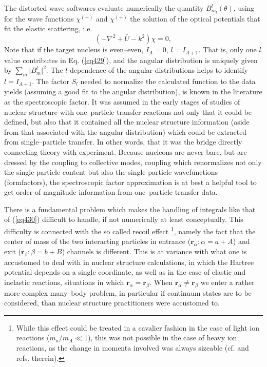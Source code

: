 \begin{subappendices}
The distorted wave softwares evaluate numerically  the quantity $B_{m_l}^l(\theta)$, using for the wave functions $\chi^{(-)}$ and $\chi^{(+)}$ the solution of the optical potentials that fit the elastic scattering, i.e.
\begin{equation}\label{eq435}
(-\nabla ^2+\bar U-k^2) \chi=0,
\end{equation}
Note that if the target nucleus is even--even, $I_A=0$,  $l=I_{A+1}$. That is, only one $l$ value contributes in Eq. (\ref{eq429}), and the angular distribution is uniquely given by $\sum_{m} \vert B_{m}^l\vert^2$. The $l$-dependence of the angular distributions helps to identify $l=I_{A+1}$. The factor $S_l$ needed to normalize the calculated function to the data yields (assuming a good fit to the angular distribution), is known in the literature as the spectroscopic factor. It was assumed in the early stages of studies of nuclear structure with one--particle transfer reactions not only that it could be defined, but also that it contained all the nuclear structure information (aside from that associated with the angular distribution) which could be extracted from single--particle transfer. In other words, that it was the bridge directly connecting theory with experiment. Because nucleons are never bare, but are dressed by the coupling to collective modes, coupling which renormalizes not only the single-particle content but also the single-particle wavefunctions (formfactors),   the spectroscopic factor approximation is at best a helpful tool to get order of magnitude information from one--particle transfer data.



There is a fundamental problem which makes the handling of integrals like that of (\ref{eq430}) difficult to handle, if not numerically at least conceptually. This difficulty is connected with the so called recoil effect \footnote{While this effect could be treated in a cavalier fashion in the case of light ion reactions ($m_a/m_A\ll 1$), this was not possible in the case of heavy ion reactions, as the change in momenta involved was always sizeable (cf. \citet{Broglia:04a} and refs. therein).}, namely the fact that the center of mass of the two interacting particles in entrance ($\mathbf r_{\alpha}: \alpha=a+A$) and exit  ($\mathbf r_{\beta}: \beta=b+B$) channels is different. This is at variance with what one is accustomed to deal with in nuclear structure calculations, in which the Hartree potential depends on a single coordinate, as well as in the case of elastic and inelastic reactions, situations in which $\mathbf r_{\alpha}=\mathbf r_{\beta}$. When $\mathbf r_{\alpha}\neq\mathbf r_{\beta}$ we enter a rather more complex many--body problem, in particular if continuum states are to be considered, than nuclear structure practitioners were accustomed to.
 

\end{subappendices}
